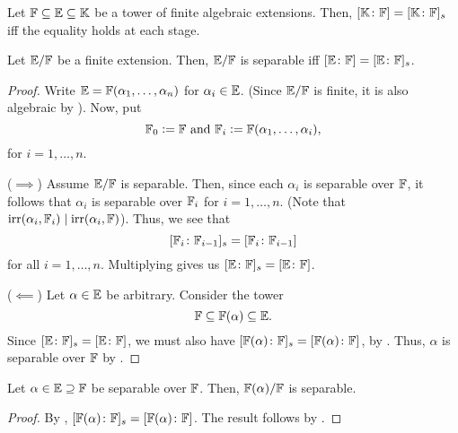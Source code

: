 \begin{cor} \label{cor:equality-at-each-stage}
    Let $\mathbb{F} \subseteq \mathbb{E} \subseteq \mathbb{K}$ be a tower of finite algebraic extensions. Then, $[\mathbb{K}\colon\mathbb{F}] = [\mathbb{K}\colon\mathbb{F}]_s$ iff the equality holds at each stage.
\end{cor}

\begin{theorem} \label{thm:separable-iff-degrees-equal}
    Let $\mathbb{E}/\mathbb{F}$ be a finite extension. Then, $\mathbb{E}/\mathbb{F}$ is separable iff $[\mathbb{E}\colon\mathbb{F}] = [\mathbb{E}\colon\mathbb{F}]_s$.
\end{theorem}
\begin{proof}
    Write $\mathbb{E} = \mathbb{F}(\alpha_1, \ldots, \alpha_n)$ for $\alpha_i \in \mathbb{E}$. (Since $\mathbb{E}/\mathbb{F}$ is finite, it is also algebraic by ). Now, put
    \[
        \mathbb{F}_0 \vcentcolon= \mathbb{F} \text{  and  } \mathbb{F}_i \vcentcolon= \mathbb{F}(\alpha_1,\ldots,\alpha_i),
    \]
    for $i=1,\ldots,n$.
    
    ($\implies$) Assume $\mathbb{E}/\mathbb{F}$ is separable. Then, since each $\alpha_i$ is separable over $\mathbb{F}$, it follows that $\alpha_i$ is separable over $\mathbb{F}_i$ for $i=1,\ldots,n$. (Note that $\operatorname{irr}(\alpha_i,\mathbb{F}_i) \mid \operatorname{irr}(\alpha_i, \mathbb{F})$). Thus, we see that
    \[
        [\mathbb{F}_i \colon \mathbb{F}_{i-1}]_s = [\mathbb{F}_i \colon \mathbb{F}_{i-1}]
    \]
    for all $i = 1,\ldots,n$. Multiplying gives us $[\mathbb{E}\colon\mathbb{F}]_s = [\mathbb{E}\colon\mathbb{F}]$.
    
    ($\impliedby$) Let $\alpha \in \mathbb{E}$ be arbitrary. Consider the tower 
    \[
        \mathbb{F} \subseteq \mathbb{F}(\alpha) \subseteq \mathbb{E}.
    \]
    Since $[\mathbb{E}\colon\mathbb{F}]_s = [\mathbb{E}\colon\mathbb{F}]$, we must also have $[\mathbb{F}(\alpha) \colon \mathbb{F}]_s = [\mathbb{F}(\alpha) \colon \mathbb{F}]$, by . Thus, $\alpha$ is separable over $\mathbb{F}$ by .
\end{proof}

\begin{cor} \label{cor:separable-element-generates-separable-extension}
    Let $\alpha \in \mathbb{E} \supseteq \mathbb{F}$ be separable over $\mathbb{F}$. Then, $\mathbb{F}(\alpha)/\mathbb{F}$ is separable.
\end{cor}
\begin{proof}
    By , $[\mathbb{F}(\alpha)\colon\mathbb{F}]_s = [\mathbb{F}(\alpha)\colon\mathbb{F}]$. The result follows by .
\end{proof}

